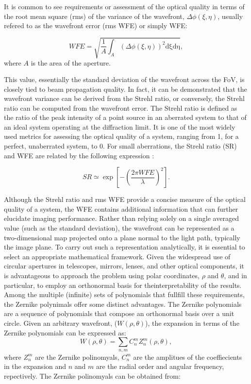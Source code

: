 It is common to see requirements or assessment of the optical quality in terms of the root mean square (rms) of the variance of the wavefront, $\Delta \phi (\xi, \eta)$, usually refered to as the wavefront error (rms WFE) or simply WFE:

\begin{equation}
  WFE = \sqrt{\frac{1}{A}\int _ {A} \left( \Delta \phi (\xi, \eta) \right) ^2 \mathrm{d \xi}\mathrm{d \eta}},
\end{equation}
where $A$ is the area of the aperture. 

This value, essentially the standard deviation of the wavefront across the FoV, is closely tied to beam propagation quality. In fact, it can be demonstrated that the wavefront variance can be derived from the Strehl ratio, or conversely, the Strehl ratio can be computed from the wavefront error. The Strehl ratio is defined as the ratio of the peak intensity of a point source in an aberrated system to that of an ideal system operating at the diffraction limit. It is one of the most widely used metrics for assessing the optical quality of a system, ranging from 1, for a perfect, unaberrated system, to 0. For small aberrations, the Strehl ratio (SR) and WFE are related by the following expression \citep{WFE_def}: 

\begin{equation}
  SR \simeq \exp \left[ - \left(\frac{2\pi WFE}{\lambda}\right) ^2 \right].
\end{equation}

Although the Strehl ratio and rms WFE provide a concise measure of the optical quality of a system, the WFE contains additional information that can further elucidate imaging performance. Rather than relying solely on a single averaged value (such as the standard deviation), the wavefront can be represented as a two-dimensional map projected onto a plane normal to the light path, typically the image plane. To carry out such a representation analytically, it is essential to select an appropriate mathematical framework. Given the widespread use of circular apertures in telescopes, mirrors, lenses, and other optical components, it is advantageous to approach the problem using polar coordinates, $\rho$ and $\theta$, and in particular, to employ an orthonormal basis for theinterpretability of the results. Among the multiple (infinite) sets of polynomials that fullfill these requirements, the Zernike polynimals \citep{Zernike} offer some distinct advantages. The Zernike polynomials are a sequence of polynomials that compose an orthonormal basis over a unit circle. Given an arbitrary wavefront, ($W(\rho, \theta)$), the expansion in terms of the Zernike polynomials can be expressed as:
\begin{equation}
  W(\rho, \theta) = \sum_{n, m} C _n ^m Z _ n ^m(\rho, \theta),
\end{equation}
where $Z _n ^m$ are the Zernike polinomyals, $C_n ^m$ are the amplitues of the coeffiecients in the expansion and $n$ and $m$ are the radial order and angular frequency, repectively. The Zernike polinomyals can be obtained from:

